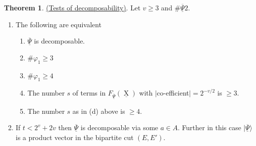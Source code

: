 \documentclass[a4paper,12pt]{article}
\DeclareMathOperator{\x}{\mathrm{X}}
\theoremstyle{definition}
\theoremstyle{underlinethm}
\newtheorem{thm}{Theorem}[section]
\theoremstyle{underline}
\begin{document}
\begin{thm}\label{3.2}
\underline{(Tests of decomposability)}. Let $v\geq 3$ and $\# \underline{\overline{\Psi}} 2$.
\begin{enumerate}[label=(\roman*)]
\item The following are equivalent
\begin{enumerate}[label=(\alph*)]
\item $\underline{\overline{\Psi}}$ is decomposable.

\item $\# \varphi_{1} \geq 3$

\item $\# \varphi_{1} \geq 4$

\item The number $s$ of terms in $F_{\underline{\overline{\Psi}}}(\underline{\x})$ with $|$co-efficient$|= 2^{-v/2}$ is $\geq 3$.

\item The number $s$  as in (d) above is $\geq 4$.

\end{enumerate}

\item If $t < 2^{v} + 2v$ then $\underline{\overline{\Psi}}$ is decomposable via  some $a \in A$. Further in this case $| \underline{\overline{\Psi}} \rangle$ is a product vector in the bipartite cut $(E, E')$.
\end{enumerate}

\end{thm}
\end{document}
